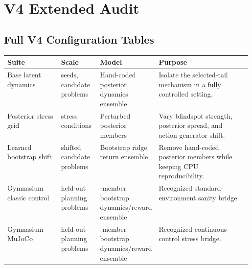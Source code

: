 \documentclass{article}
\begin{document}
\section{V4 Extended Audit}

\subsection{Full V4 Configuration Tables}

\begin{center}
\small
\begin{tabularx}{\linewidth}{p{0.22\linewidth}p{0.16\linewidth}p{0.20\linewidth}X}
\toprule
Suite & Scale & Model & Purpose \\
\midrule
Base latent dynamics &
\PaperSeeds{} seeds, \PaperProblems{} candidate problems &
Hand-coded posterior dynamics ensemble &
Isolate the selected-tail mechanism in a fully controlled setting. \\
Posterior stress grid &
\VThreeStressConditions{} stress conditions &
Perturbed posterior members &
Vary blindspot strength, posterior spread, and action-generator shift. \\
Learned bootstrap shift &
\VThreeLearnedProblems{} shifted candidate problems &
Bootstrap ridge return ensemble &
Remove hand-coded posterior members while keeping CPU reproducibility. \\
Gymnasium classic control &
\VFourGymProblems{} held-out planning problems &
\VFourGymEnsembleSize{}-member bootstrap dynamics/reward ensemble &
Recognized standard-environment sanity bridge. \\
Gymnasium MuJoCo &
\VFourMujocoProblems{} held-out planning problems &
\VFourMujocoEnsembleSize{}-member bootstrap dynamics/reward ensemble &
Recognized continuous-control stress bridge. \\
\bottomrule
\end{tabularx}
\end{center}
\end{document}
